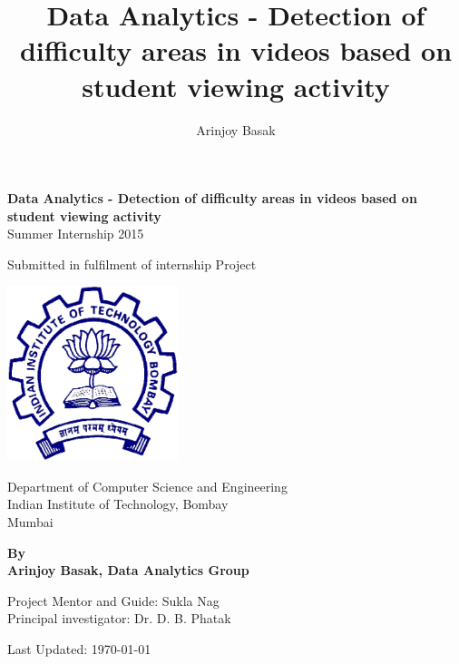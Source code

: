 \documentclass[16pt]{report}
\title{Data Analytics - Detection of difficulty areas in
videos based on student viewing activity}
\author{Arinjoy Basak}
\begin{document}
\begin{titlepage}
 \begin{center}

\Huge
\textbf{Data Analytics - Detection of difficulty areas in
videos based on student viewing activity} \\
\vspace{30pt}
Summer Internship 2015
\vspace{30pt}

\LARGE
Submitted in fulfilment of internship Project
\vspace{30pt}

\centering
\includegraphics[width=5cm]{./iitb_logo.jpg}

\begin{small}
Department of Computer Science and Engineering\\
Indian Institute of Technology, Bombay\\
Mumbai\\
\end{small}

\vfill
\textbf{By}\\
\textbf{Arinjoy Basak, Data Analytics Group}\\
\vfill

Project Mentor and Guide: Sukla Nag\\
Principal investigator: Dr. D. B. Phatak
\vfill

\Large
Last Updated: \today
\end{center}
\end{titlepage}


\pagebreak
\setcounter{page}{1}


\pagebreak
\end{document}
